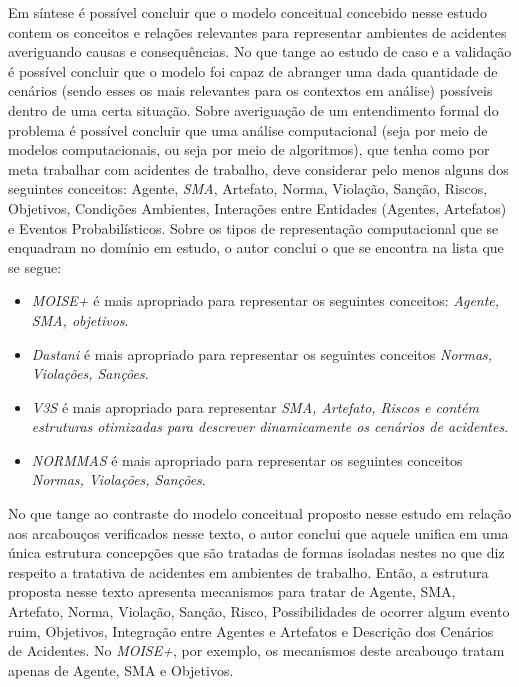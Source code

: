 Em síntese é possível concluir que o modelo conceitual concebido nesse estudo contem os conceitos e relações relevantes para representar ambientes de acidentes averiguando causas e consequências. No que tange ao estudo de caso e a validação é possível concluir que o modelo foi capaz de abranger uma dada quantidade de cenários (sendo esses os mais relevantes para os contextos em análise) possíveis dentro de uma certa situação. Sobre averiguação de um entendimento formal do problema é possível concluir que uma análise computacional (seja por meio de modelos computacionais, ou seja por meio de algoritmos), que tenha como por meta trabalhar com acidentes de trabalho, deve considerar pelo menos alguns dos seguintes conceitos: Agente, \textit{SMA}, Artefato, Norma, Violação, Sanção, Riscos, Objetivos, Condições Ambientes, Interações entre Entidades (Agentes, Artefatos) e Eventos Probabilísticos. Sobre os tipos de representação computacional que se enquadram no domínio em estudo, o autor conclui o que se encontra na lista que se segue:
\begin{itemize}
    \item \textit{MOISE+} é mais apropriado para representar os seguintes conceitos: \textit{Agente, SMA, objetivos}.
    \item \textit{Dastani} é mais apropriado para representar os seguintes conceitos \textit{Normas, Violações, Sanções}.
    \item \textit{V3S} é mais apropriado para representar \textit{SMA, Artefato, Riscos e contém estruturas otimizadas para descrever dinamicamente os cenários de acidentes}.
    \item \textit{NORMMAS} é mais apropriado para representar os seguintes conceitos \textit{Normas, Violações, Sanções}.
\end{itemize}

No que tange ao contraste do modelo conceitual proposto nesse estudo em relação aos arcabouços verificados nesse texto, o autor conclui que aquele unifica em uma única estrutura concepções que são tratadas de formas isoladas nestes no que diz respeito a tratativa de acidentes em ambientes de trabalho. Então, a estrutura proposta nesse texto apresenta mecanismos para tratar de Agente, SMA, Artefato, Norma, Violação, Sanção, Risco, Possibilidades de ocorrer algum evento ruim, Objetivos, Integração entre Agentes e Artefatos e Descrição dos Cenários de Acidentes. No \textit{MOISE+}, por exemplo, os mecanismos deste arcabouço tratam apenas de Agente, SMA e Objetivos.